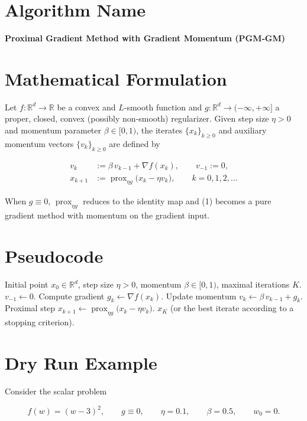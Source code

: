\documentclass{article}
\newcommand{\prox}{\operatorname{prox}}
\newcommand{\grad}{\nabla}
\newcommand{\R}{\mathbb{R}}
\begin{document}
\section*{Algorithm Name}
\textbf{Proximal Gradient Method with Gradient Momentum (PGM‑GM)}  

\section*{Mathematical Formulation}
Let $f:\R^{d}\to\R$ be a convex and $L$‑smooth function and $g:\R^{d}\to(-\infty,+\infty]$ a proper, closed, convex (possibly non‑smooth) regularizer.  
Given step size $\eta>0$ and momentum parameter $\beta\in[0,1)$, the iterates $\{x_k\}_{k\ge 0}$ and auxiliary momentum vectors $\{v_k\}_{k\ge 0}$ are defined by  

\[
\begin{aligned}
v_k &:= \beta\,v_{k-1} + \grad f(x_k), \qquad v_{-1}:=0,\\[4pt]
x_{k+1} &:= \prox_{\eta g}\!\bigl(x_k - \eta v_k\bigr),\qquad k=0,1,2,\dots
\end{aligned}
\tag{1}
\]

When $g\equiv 0$, $\prox_{\eta g}$ reduces to the identity map and (1) becomes a pure gradient method with momentum on the gradient input.

\section*{Pseudocode}
\begin{algorithm}[H]
\caption{PGM‑GM}
\begin{algorithmic}[1]
\REQUIRE Initial point $x_0\in\R^{d}$, step size $\eta>0$, momentum $\beta\in[0,1)$, maximal iterations $K$.
\STATE $v_{-1}\gets 0$.
    \STATE Compute gradient $g_k \gets \grad f(x_k)$.
    \STATE Update momentum \; $v_k \gets \beta\,v_{k-1}+g_k$.
    \STATE Proximal step \; $x_{k+1}\gets \prox_{\eta g}\!\bigl(x_k-\eta v_k\bigr)$.
\ENDFOR
\RETURN $x_K$ (or the best iterate according to a stopping criterion).
\end{algorithmic}
\end{algorithm}

\section*{Dry Run Example}
Consider the scalar problem  

\[
f(w) = (w-3)^2,\qquad g\equiv 0,\qquad \eta =0.1,\qquad \beta =0.5,\qquad w_0=0.
\]
\end{document}
